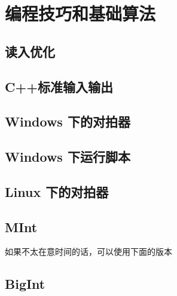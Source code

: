 \chapter{编程技巧和基础算法}

\section{读入优化}


\section{C++标准输入输出}
















\section{Windows 下的对拍器}


\section{Windows 下运行脚本}


\section{Linux 下的对拍器}



\section{MInt}


如果不太在意时间的话，可以使用下面的版本



\section{BigInt}

